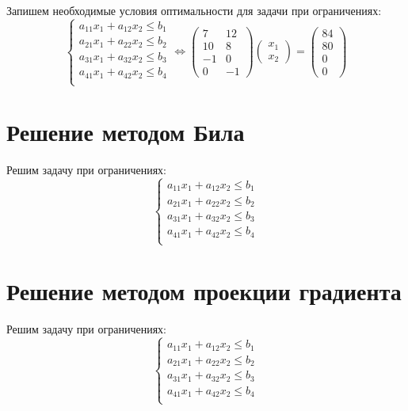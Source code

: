 Запишем необходимые условия оптимальности для задачи при ограничениях:
\begin{equation*}
\begin{cases}
a_{11} x_1 + a_{12} x_2 \leq b_1 \\
a_{21} x_1 + a_{22} x_2 \leq b_2 \\
a_{31} x_1 + a_{32} x_2 \leq b_3 \\
a_{41} x_1 + a_{42} x_2 \leq b_4 \\
\end{cases}
\Longleftrightarrow
\begin{pmatrix}
	7 & 12 \\
	10 & 8 \\
	-1 & 0 \\
	0 & -1
\end{pmatrix}
\begin{pmatrix}
	x_1 \\
	x_2
\end{pmatrix} =
\begin{pmatrix}
	84 \\
	80 \\
	0 \\
	0
\end{pmatrix}
\end{equation*}

\section{Решение методом Била}

Решим задачу при ограничениях:
\begin{equation*}
\begin{cases}
a_{11} x_1 + a_{12} x_2 \leq b_1 \\
a_{21} x_1 + a_{22} x_2 \leq b_2 \\
a_{31} x_1 + a_{32} x_2 \leq b_3 \\
a_{41} x_1 + a_{42} x_2 \leq b_4 \\
\end{cases}
\end{equation*}

\section{Решение методом проекции градиента}

Решим задачу при ограничениях:
\begin{equation*}
\begin{cases}
a_{11} x_1 + a_{12} x_2 \leq b_1 \\
a_{21} x_1 + a_{22} x_2 \leq b_2 \\
a_{31} x_1 + a_{32} x_2 \leq b_3 \\
a_{41} x_1 + a_{42} x_2 \leq b_4 \\
\end{cases}
\end{equation*}

